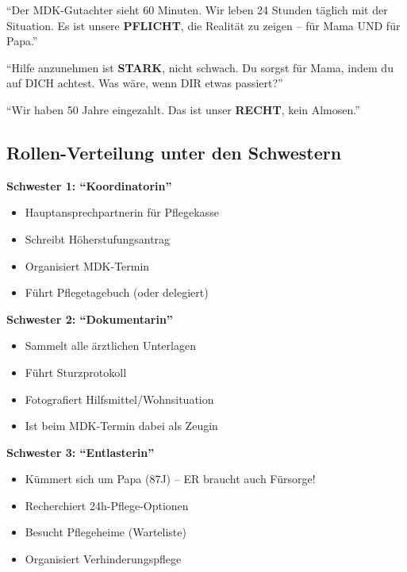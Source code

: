 \documentclass[11pt,a4paper]{article}
\begin{document}
\begin{infobox}
``Der MDK-Gutachter sieht 60 Minuten. Wir leben 24 Stunden täglich mit der Situation. Es ist unsere \textbf{PFLICHT}, die Realität zu zeigen -- für Mama UND für Papa.''
\end{infobox}

\begin{infobox}
``Hilfe anzunehmen ist \textbf{STARK}, nicht schwach. Du sorgst für Mama, indem du auf DICH achtest. Was wäre, wenn DIR etwas passiert?''
\end{infobox}

\begin{infobox}
``Wir haben 50 Jahre eingezahlt. Das ist unser \textbf{RECHT}, kein Almosen.''
\end{infobox}

\subsection{Rollen-Verteilung unter den Schwestern}

\begin{graybox}
\textbf{Schwester 1: ``Koordinatorin''}
\begin{itemize}[noitemsep]
    \item Hauptansprechpartnerin für Pflegekasse
    \item Schreibt Höherstufungsantrag
    \item Organisiert MDK-Termin
    \item Führt Pflegetagebuch (oder delegiert)
\end{itemize}

\textbf{Schwester 2: ``Dokumentarin''}
\begin{itemize}[noitemsep]
    \item Sammelt alle ärztlichen Unterlagen
    \item Führt Sturzprotokoll
    \item Fotografiert Hilfsmittel/Wohnsituation
    \item Ist beim MDK-Termin dabei als Zeugin
\end{itemize}

\textbf{Schwester 3: ``Entlasterin''}
\begin{itemize}[noitemsep]
    \item Kümmert sich um Papa (87J) -- ER braucht auch Fürsorge!
    \item Recherchiert 24h-Pflege-Optionen
    \item Besucht Pflegeheime (Warteliste)
    \item Organisiert Verhinderungspflege
\end{itemize}
\end{graybox}
\end{document}
